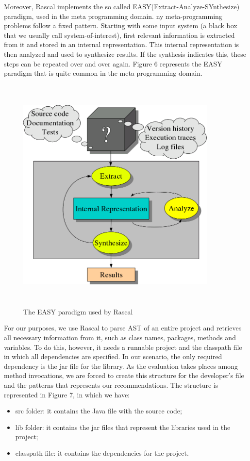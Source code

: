 Moreover, Rascal implements the so called EASY(Extract-Analyze-SYnthesize) paradigm, used in the meta programming domain.  ny meta-programming problems follow a fixed pattern. Starting with some input system (a black box that we usually call system-of-interest), first relevant information is extracted from it and stored in an internal representation. This internal representation is then analyzed and used to synthesize results. If the synthesis indicates this, these steps can be repeated over and over again. Figure 6 represents the EASY paradigm that is quite common in the meta programming domain.

\begin{figure}[H]
\includegraphics[width=10cm,height=12cm,keepaspectratio]{images/EASY.png}
\centering
  \caption{The EASY paradigm used by Rascal}
  \label{fig:cmd}
\end{figure}

For our purposes, we use Rascal to parse AST of an entire project and retrieves all necessary information from it, such as class names, packages, methods and variables.
To do this, however, it needs a runnable project and the classpath file in which all dependencies are specified. In our scenario, the only required dependency is the jar file for the library. As the evaluation takes places among method invocations, we are forced to create this structure for the developer's file and the patterns that represents our recommendations. The structure is represented in Figure 7, in which we have:
\begin{itemize}
\item src folder: it contains the Java file with the source code;
\item lib folder: it contains the jar files that represent the libraries used in the project;
\item classpath file: it contains the dependencies for the project.
\end{itemize}


